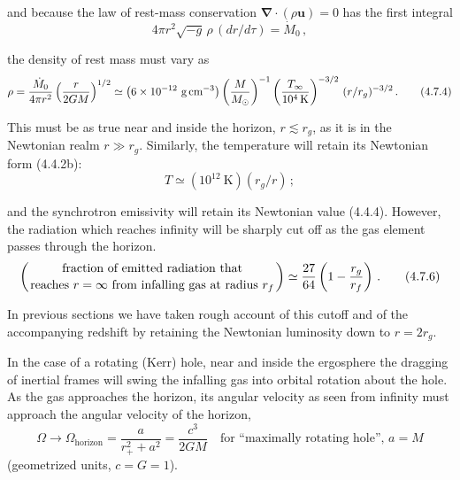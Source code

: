 and because the law of rest-mass conservation $\boldsymbol{\nabla}\cdot(\rho \mathbf{u}) = 0$ has the first integral
%
\begin{equation}
4\pi r^2 \sqrt{-g}\, \rho\,(dr/d\tau) = \dot{M}_0\,,
\tag{4.7.3}
\end{equation}

the density of rest mass must vary as
%
\begin{equation}
\rho = \frac{\dot{M}_0}{4\pi r^2} \left(\frac{r}{2GM}\right)^{1/2}
\simeq \left(6 \times 10^{-12}~\text{g\,cm}^{-3}\right)
\left(\frac{M}{M_\odot}\right)^{-1}
\left(\frac{T_\infty}{10^4\,\text{K}}\right)^{-3/2}
\,(r/r_g)^{-3/2}\,.
\tag{4.7.4}
\end{equation}

This must be as true near and inside the horizon, $r \lesssim r_g$, as it is in the Newtonian
realm $r \gg r_g$.  Similarly, the temperature will retain its Newtonian form (4.4.2b):
%
\begin{equation}
T \simeq (10^{12}~\text{K})(r_g/r)\,;
\tag{4.7.5}
\end{equation}

and the synchrotron emissivity will retain its Newtonian value (4.4.4).  However,
the radiation which reaches infinity will be sharply cut off as the gas element
passes through the horizon.
%
\begin{equation}
\left(\text{fraction of emitted radiation that}\atop
\text{reaches } r = \infty \text{ from infalling gas at radius } r_f\right)
\simeq \frac{27}{64}\left(1 - \frac{r_g}{r_f}\right)\,.
\tag{4.7.6}
\end{equation}

In previous sections we have taken rough account of this cutoff and of the
accompanying redshift by retaining the Newtonian luminosity down to $r = 2r_g$.

In the case of a rotating (Kerr) hole, near and inside the ergosphere the
dragging of inertial frames will swing the infalling gas into orbital rotation
about the hole.  As the gas approaches the horizon, its angular velocity as seen
from infinity must approach the angular velocity of the horizon,
%
\begin{equation}
\Omega \to \Omega_{\text{horizon}} = \frac{a}{r_+^2 + a^2}
= \frac{c^3}{2GM}
\quad\text{for ``maximally rotating hole'', } a = M
\tag{4.7.7}
\end{equation}
%
(geometrized units, $c = G = 1$).

